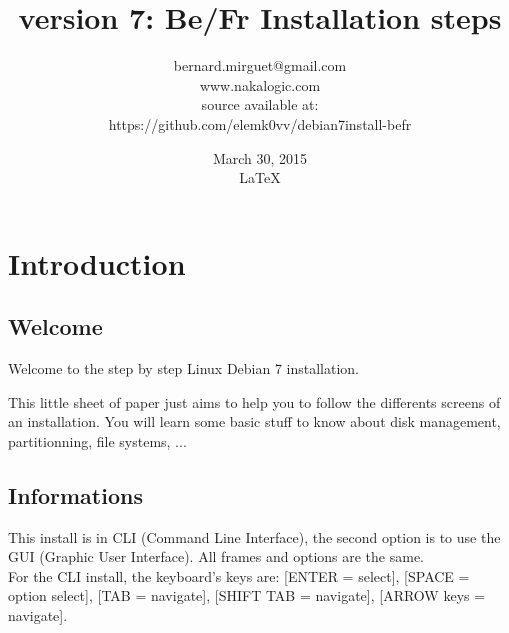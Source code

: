 \documentclass[a4paper,12pt]{book}
\begin{document}



\title{version 7: Be/Fr Installation steps }
\author{bernard.mirguet@gmail.com \\www.nakalogic.com \\source available at: \\https://github.com/elemk0vv/debian7install-befr}
\date{March 30, 2015\\\LaTeX}
\maketitle

\tableofcontents


\chapter[Intro]{Introduction}
\section{Welcome}
Welcome to the step by step Linux Debian 7 installation.

This little sheet of paper just aims to help you to follow the differents screens of an installation. You will learn some basic stuff to know about disk management, partitionning, file systems, ...



\section{Informations}
This install is in CLI (Command Line Interface), the second option is to use the GUI (Graphic User Interface). All frames and options are the same. 
\\For the CLI install, the keyboard's keys are: [ENTER = select], [SPACE = option select], [TAB = navigate], [SHIFT TAB = navigate], [ARROW keys = navigate].
\end{document}
